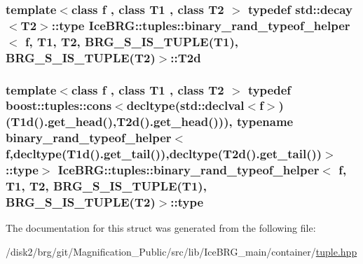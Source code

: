 \subsubsection[{T2d}]{\setlength{\rightskip}{0pt plus 5cm}template$<$class f , class T1 , class T2 $>$ typedef std\+::decay$<$T2$>$\+::{\bf type} {\bf Ice\+B\+R\+G\+::tuples\+::binary\+\_\+rand\+\_\+typeof\+\_\+helper}$<$ f, T1, T2, {\bf B\+R\+G\+\_\+\+S\+\_\+\+I\+S\+\_\+\+T\+U\+P\+L\+E}(T1), {\bf B\+R\+G\+\_\+\+S\+\_\+\+I\+S\+\_\+\+T\+U\+P\+L\+E}(T2)$>$\+::{\bf T2d}}\label{structIceBRG_1_1tuples_1_1binary__rand__typeof__helper_3_01f_00_01T1_00_01T2_00_01BRG__S__IS__TU17fb7ccd40b5d61da5648c1c2c034d10_a2420a925e99c75598b0f37e7d343611a}
\hypertarget{structIceBRG_1_1tuples_1_1binary__rand__typeof__helper_3_01f_00_01T1_00_01T2_00_01BRG__S__IS__TU17fb7ccd40b5d61da5648c1c2c034d10_a61cbebee9807ea6b3a33eeb06d2ef241}{}
\subsubsection[{type}]{\setlength{\rightskip}{0pt plus 5cm}template$<$class f , class T1 , class T2 $>$ typedef boost\+::tuples\+::cons$<$decltype(std\+::declval$<$f$>$)({\bf T1d}().get\+\_\+head(),{\bf T2d}().get\+\_\+head())), typename {\bf binary\+\_\+rand\+\_\+typeof\+\_\+helper}$<$f,decltype({\bf T1d}().get\+\_\+tail()),decltype({\bf T2d}().get\+\_\+tail())$>$\+::{\bf type}$>$ {\bf Ice\+B\+R\+G\+::tuples\+::binary\+\_\+rand\+\_\+typeof\+\_\+helper}$<$ f, T1, T2, {\bf B\+R\+G\+\_\+\+S\+\_\+\+I\+S\+\_\+\+T\+U\+P\+L\+E}(T1), {\bf B\+R\+G\+\_\+\+S\+\_\+\+I\+S\+\_\+\+T\+U\+P\+L\+E}(T2)$>$\+::{\bf type}}\label{structIceBRG_1_1tuples_1_1binary__rand__typeof__helper_3_01f_00_01T1_00_01T2_00_01BRG__S__IS__TU17fb7ccd40b5d61da5648c1c2c034d10_a61cbebee9807ea6b3a33eeb06d2ef241}


The documentation for this struct was generated from the following file\+:\begin{DoxyCompactItemize}
\item 
/disk2/brg/git/\+Magnification\+\_\+\+Public/src/lib/\+Ice\+B\+R\+G\+\_\+main/container/\hyperlink{tuple_8hpp}{tuple.\+hpp}\end{DoxyCompactItemize}
